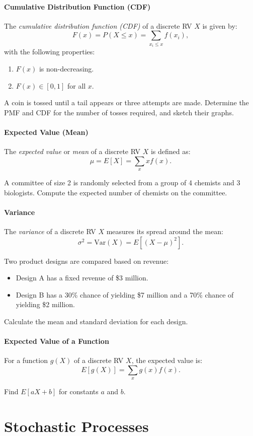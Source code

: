 \documentclass{article}
\begin{document}
\subsection{Cumulative Distribution Function (CDF)}
The \textit{cumulative distribution function (CDF)} of a discrete RV $X$ is given by:
\[
F(x) = P(X \leq x) = \sum_{x_i \leq x} f(x_i),
\]
with the following properties:
\begin{enumerate}
    \item $F(x)$ is non-decreasing.
    \item $F(x) \in [0, 1]$ for all $x$.
\end{enumerate}

\begin{example}
A coin is tossed until a tail appears or three attempts are made. Determine the PMF and CDF for the number of tosses required, and sketch their graphs.
\end{example}

\subsection{Expected Value (Mean)}
The \textit{expected value} or \textit{mean} of a discrete RV $X$ is defined as:
\[
\mu = E[X] = \sum_x x f(x).
\]

\begin{example}
A committee of size 2 is randomly selected from a group of 4 chemists and 3 biologists. Compute the expected number of chemists on the committee.
\end{example}

\subsection{Variance}
The \textit{variance} of a discrete RV $X$ measures its spread around the mean:
\[
\sigma^2 = \mathrm{Var}(X) = E[(X - \mu)^2].
\]

\begin{example}
Two product designs are compared based on revenue:
\begin{itemize}
    \item Design A has a fixed revenue of \$3 million.
    \item Design B has a 30\% chance of yielding \$7 million and a 70\% chance of yielding \$2 million.
\end{itemize}
Calculate the mean and standard deviation for each design.
\end{example}

\subsection{Expected Value of a Function}
For a function $g(X)$ of a discrete RV $X$, the expected value is:
\[
E[g(X)] = \sum_x g(x) f(x).
\]

\begin{example}
Find $E[aX + b]$ for constants $a$ and $b$.
\end{example}

\newpage
\part{Stochastic Processes}
\end{document}
